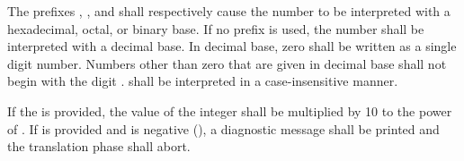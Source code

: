 \specsubitem
The prefixes , , and  shall respectively
cause the number to be interpreted with a hexadecimal, octal, or binary base.
If no prefix is used, the number shall be interpreted with a decimal base.
In decimal base, zero shall be written as a single digit number. Numbers other
than zero that are given in decimal base shall not begin with the digit
.  shall be interpreted in a
case-insensitive manner.

\specsubitem
If the  is provided, the value of the
integer shall be multiplied by 10 to the power of .
If  is provided and is negative (\terminal{-}), a diagnostic
message shall be printed and the translation phase shall abort.

\begin{grammar}
 \exactly \\
	\terminal{\textquotesingle}  \terminal{\textquotesingle} \\

 \\
	 \\
	 \\

 \exactly \\
	 \\
	   \\
	  \\
	  \\


 \exactly \\
	    \\

 \exactly \\
	  \\

 \oneof \\
	\terminal{\textbackslash\textbackslash}
	\terminal{\textbackslash\textquotesingle}
	 \\
\end{grammar}

